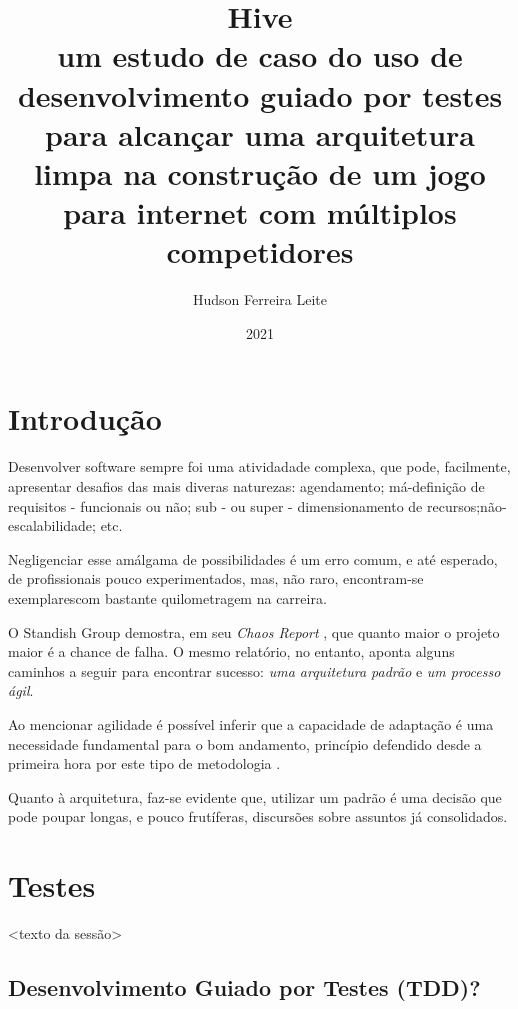 \documentclass[12pt,a4paper,oneside,english,brazil]{article}
\title{
      \textbf{Hive} \\
      \large um estudo de caso do uso de desenvolvimento guiado por testes para
      alcançar uma arquitetura limpa na construção de um jogo para internet com
      múltiplos competidores
    }
\author{Hudson Ferreira Leite}
\date{2021}
\begin{document}
  \maketitle

  \clearpage

    \renewcommand\refname{Lista de Figuras}

      \listoffigures

  \clearpage

  \section{Introdução}

    Desenvolver software sempre foi uma atividadade complexa, que pode,
    facilmente,  apresentar desafios das mais diveras naturezas: agendamento;
    má-definição de  requisitos - funcionais ou não; sub - ou super -
    dimensionamento de recursos;não-escalabilidade; etc.

    Negligenciar esse amálgama de possibilidades é um erro comum, e até
    esperado,  de profissionais pouco experimentados, mas, não raro, encontram-se
    exemplarescom bastante quilometragem na carreira.

    O Standish Group demostra, em seu \emph{Chaos Report}
    \cite{ChaosReport2015},  que quanto maior o projeto maior é a chance de
    falha. O mesmo relatório, no entanto, aponta alguns caminhos a seguir para
    encontrar sucesso: \emph{uma arquitetura padrão} e \emph{um processo ágil}.

    Ao mencionar agilidade é possível inferir que a capacidade de adaptação é
    uma  necessidade fundamental para o bom andamento, princípio defendido desde
    a  primeira hora por este tipo de metodologia \cite{ManifestoAgil2001}.

    Quanto à  arquitetura, faz-se evidente que, utilizar um padrão é uma decisão
    que  pode poupar longas, e pouco frutíferas, discursões sobre assuntos já
    consolidados.

  \section{Testes}

    <texto da sessão>

    \subsection{Desenvolvimento Guiado por Testes (TDD)?}
\end{document}
